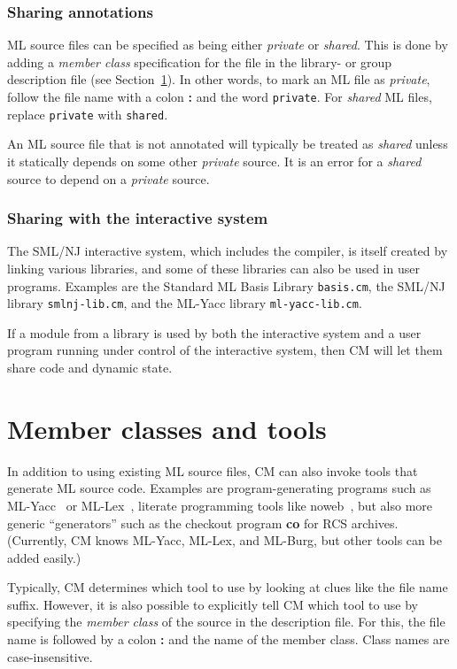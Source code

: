 \documentclass{article}
\begin{document}
\subsubsection*{Sharing annotations}

ML source files can be specified as being either {\em private} or {\em
shared}.  This is done by adding a {\em member class} specification
for the file in the library- or group description file (see
Section~\ref{sec:classes}).  In other words, to mark an ML file as
{\em private}, follow the file name with a colon {\bf :} and the word
{\tt private}.  For {\em shared} ML files, replace {\tt private} with
{\tt shared}.

An ML source file that is not annotated will typically be treated as
{\em shared} unless it statically depends on some other {\em private}
source.  It is an error for a {\em shared} source to depend on a {\em
private} source.

\subsubsection*{Sharing with the interactive system}

The SML/NJ interactive system, which includes the compiler, is itself
created by linking various libraries, and some of these libraries can
also be used in user programs.  Examples are the Standard ML Basis
Library {\tt basis.cm}, the SML/NJ library {\tt smlnj-lib.cm}, and the
ML-Yacc library {\tt ml-yacc-lib.cm}.

If a module from a library is used by both the interactive system and
a user program running under control of the interactive system, then
CM will let them share code and dynamic state.

\section{Member classes and tools}
\label{sec:classes}

In addition to using existing ML source files, CM can also invoke
tools that generate ML source code.  Examples are
program-generating programs such as ML-Yacc~\cite{tarditi90:yacc} or
ML-Lex~\cite{appel89:lex}, literate programming tools like
noweb~\cite{ramsey:simplified}, but also more generic ``generators''
such as the checkout program {\bf co} for RCS archives.
(Currently, CM knows ML-Yacc, ML-Lex, and ML-Burg, but other tools can
be added easily.)

Typically, CM determines which tool to use by looking at clues like
the file name suffix.  However, it is also possible to explicitly tell
CM which tool to use by specifying the {\em member class} of the
source in the description file.  For this, the file name is followed
by a colon {\bf :} and the name of the member class.  Class names are
case-insensitive.
\end{document}
